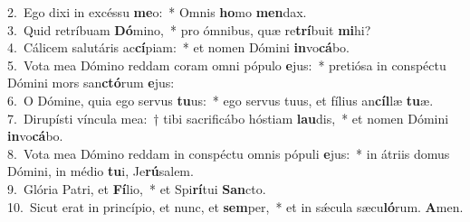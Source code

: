 {2.~}Ego dixi in excéssu \textbf{me}o:~* Omnis \textbf{ho}mo \textbf{men}dax.\\
{3.~}Quid retríbuam \textbf{Dó}mino,~* pro ómnibus, quæ re\textbf{trí}buit \textbf{mi}hi?\\
{4.~}Cálicem salutáris ac\textbf{cí}piam:~* et nomen Dómini \textbf{in}vo\textbf{cá}bo.\\
{5.~}Vota mea Dómino reddam coram omni pópulo \textbf{e}jus:~* pretiósa in conspéctu Dómini mors san\textbf{ctó}rum \textbf{e}jus:\\
{6.~}O Dómine, quia ego servus \textbf{tu}us:~* ego servus tuus, et fílius an\textbf{cíl}læ \textbf{tu}æ.\\
{7.~}Dirupísti víncula mea:~† tibi sacrificábo hóstiam \textbf{lau}dis,~* et nomen Dómini \textbf{in}vo\textbf{cá}bo.\\
{8.~}Vota mea Dómino reddam in conspéctu omnis pópuli \textbf{e}jus:~* in átriis domus Dómini, in médio \textbf{tu}i, Je\textbf{rú}salem.\\
{9.~}Glória Patri, et \textbf{Fí}lio,~* et Spi\textbf{rí}tui \textbf{San}cto.\\
{10.~}Sicut erat in princípio, et nunc, et \textbf{sem}per,~* et in sǽcula sæcu\textbf{ló}rum. \textbf{A}men.\\
